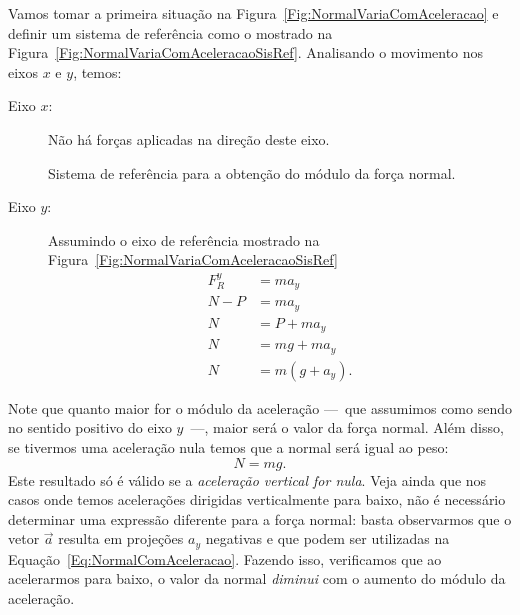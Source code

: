 Vamos tomar a primeira situação na Figura~\ref{Fig:NormalVariaComAceleracao} e definir um sistema de referência como o mostrado na Figura~\ref{Fig:NormalVariaComAceleracaoSisRef}. Analisando o movimento nos eixos $x$ e $y$, temos:
\begin{description}
    \item[Eixo $x$:] Não há forças aplicadas na direção deste eixo.
    
\begin{marginfigure}
\centering
{}
\caption{Sistema de referência para a obtenção do módulo da força normal.\label{Fig:NormalVariaComAceleracaoSisRef}}
\end{marginfigure}

    \item[Eixo $y$:] Assumindo o eixo de referência mostrado na Figura~\ref{Fig:NormalVariaComAceleracaoSisRef}
        \begin{align}
            F_R^y &= m a_y \\
            N - P &= m a_y \\
            N &= P + m a_y \\
            N &= mg + m a_y \\
            N &= m(g + a_y). \label{Eq:NormalComAceleracao}
        \end{align}
\end{description}

\noindent{}Note que quanto maior for o módulo da aceleração ---~que assumimos como sendo no sentido positivo do eixo $y$~---, maior será o valor da força normal. Além disso, se tivermos uma aceleração nula temos que a normal será igual ao peso:
\begin{equation}
    N = mg.
\end{equation}
%
Este resultado só é válido se a \emph{aceleração vertical for nula}. Veja ainda que nos casos onde temos acelerações dirigidas verticalmente para baixo, não é necessário determinar uma expressão diferente para a força normal: basta observarmos que o vetor $\vec{a}$ resulta em projeções $a_y$ negativas e que podem ser utilizadas na Equação~\eqref{Eq:NormalComAceleracao}. Fazendo isso, verificamos que ao acelerarmos para baixo, o valor da normal \emph{diminui} com o aumento do módulo da aceleração.

